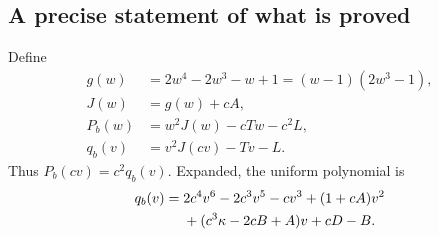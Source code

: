 \documentclass[11pt,a4paper]{article}
\theoremstyle{definition}
\newcommand{\kk}{\kappa}
\begin{document}
\subsection{A precise statement of what is proved}
Define
\begin{align}
 g(w)&=2w^4-2w^3-w+1=(w-1)(2w^3-1),\label{f6:eq:g}\\
 J(w)&=g(w)+cA,\label{f6:eq:J}\\
 P_b(w)&=w^2J(w)-cTw-c^2L,\label{f6:eq:P}\\
 q_b(v)&=v^2J(cv)-Tv-L.\label{f6:eq:qcompact}
\end{align}
Thus $P_b(cv)=c^2q_b(v)$. Expanded, the uniform polynomial is
\begin{align}
 q_b(v)={}&2c^4v^6-2c^3v^5-cv^3+(1+cA)v^2\notag\\
 &+(c^3\kk-2cB+A)v+cD-B.\label{f6:eq:q}
\end{align}
\end{document}
